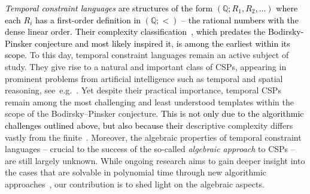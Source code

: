\documentclass[a4paper,reqno, cleveref]{amsart}
\newcommand{\Q}{\mathbb{Q}}
\newcommand\jo[1]{\textcolor{black}{#1}} %
\begin{document}
\jo{\emph{Temporal constraint languages} are structures of the form $(\Q; R_1, R_2, \dots)$ where each $R_i$ has a first-order definition in $(\Q; <)$ -- the rational numbers with the dense linear order. Their  complexity classification~\cite{tcsps_conf,bodirsky_complexity_2010}, which predates the Bodirsky-Pinsker conjecture and most likely inspired it,  is among the earliest within its scope.   } 
 To this day, temporal constraint languages remain an active subject of study.
 They give rise to 
 a natural and important class of CSPs, appearing in prominent problems from artificial intelligence such as temporal and spatial reasoning, see~e.g.~\cite{RCC5JD,BroxvallJonsson,KrokhinJeavonsJonsson,DrakengrenJonssonMetric,BJMMS}. 
 Yet despite their practical importance, temporal CSPs remain among the most challenging and least understood templates within the scope of the Bodirsky–Pinsker conjecture. \jo{This is not only due to the algorithmic challenges outlined above, but also because their} %
 descriptive complexity %
 differs vastly from the finite~\cite{RydvalDescr}. Moreover,  the algebraic properties of temporal constraint languages -- crucial to the success of the so-called \emph{algebraic approach} to CSPs -- are still largely unknown. 
 While ongoing research aims to gain deeper insight into the cases that are solvable in polynomial time through new algorithmic approaches~\cite{synergies}, our contribution is to shed light on the algebraic aspects. 
\end{document}
